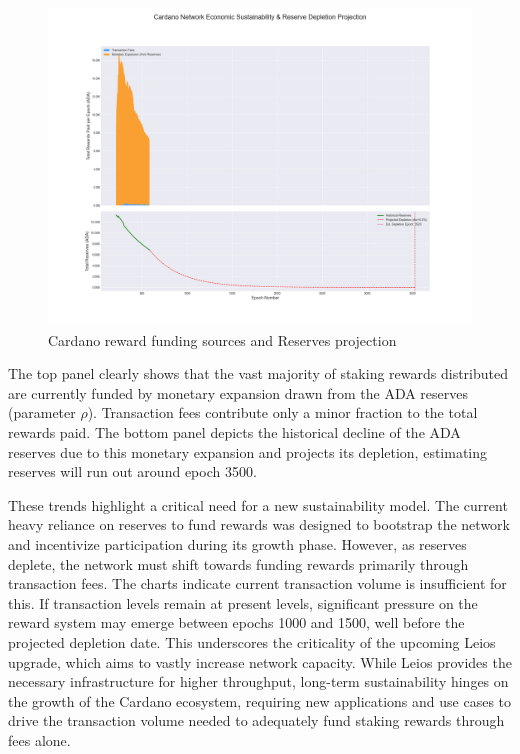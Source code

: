 \documentclass[11pt, letterpaper]{article}
\begin{document}
\begin{figure}[H]
	\centering
	\includegraphics[width=\textwidth]{img/sustainability_trends_with_projection_208-583.png}
	\caption{Cardano reward funding sources and Reserves projection}
	\label{fig:sustainability_trends}
\end{figure}

The top panel clearly shows that the vast majority of staking rewards distributed are currently funded
by monetary expansion drawn from the ADA reserves (parameter $\rho$). Transaction fees contribute only a
minor fraction to the total rewards paid. The bottom panel depicts the historical decline of the ADA reserves
due to this monetary expansion and projects its depletion, estimating reserves will run out around epoch 3500.

These trends highlight a critical need for a new sustainability model. The current heavy reliance
on reserves to fund rewards was designed to bootstrap the network and incentivize
participation during its growth phase. However, as reserves deplete, the network must shift
towards funding rewards primarily through transaction fees. The charts indicate current transaction volume
is insufficient for this. If transaction levels remain at present levels, significant pressure on the reward
system may emerge between epochs 1000 and 1500, well before the projected depletion date. This underscores
the criticality of the upcoming Leios upgrade, which aims to  vastly increase network capacity. While Leios
provides the necessary infrastructure for higher throughput, long-term sustainability hinges on the growth
of the Cardano ecosystem, requiring new applications and use cases to drive the transaction volume
needed to adequately fund staking rewards through fees alone.
\end{document}
